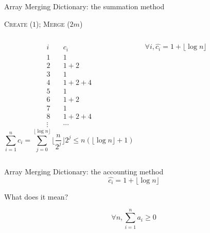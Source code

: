 
\begin{frame}{Array Merging Dictionary: the summation method}
  \centerline{\textsc{Create} ($1$); \textsc{Merge} ($2m$)}

  \begin{columns}
	  \pause
	  \begin{align*}
		i & \quad c_i \\
		1 & \quad 1  \\
		2 & \quad 1 + 2 \\
		3 & \quad 1 \\
		4 & \quad 1 + 2 + 4 \\
		5 & \quad 1 \\
		6 & \quad 1 + 2 \\
		7 & \quad 1 \\
		8 & \quad 1 + 2 + 4 \\
		\vdots & \quad \cdots
	  \end{align*}
	  \pause
	  \[
		\sum_{i=1}^{n} c_i = \sum_{j=0}^{\lfloor \log n \rfloor} \lfloor \frac{n}{2^j} \rfloor 2^j \le n (\lfloor \log n \rfloor + 1)
	  \]

	  \pause
	  \[
		\forall i, \hat{c_i} = 1 + \lfloor \log n \rfloor
	  \]
  \end{columns}
\end{frame}
\begin{frame}{Array Merging Dictionary: the accounting method}
  \[
	\hat{c_i} = 1 + \lfloor \log n \rfloor
  \]

  \pause
  \vspace{0.60cm}
  \centerline{What does it mean?}

  \pause
  \vspace{0.80cm}
  \[
	\forall n, \sum_{i=1}^{n} a_i \geq 0
  \]
\end{frame}

